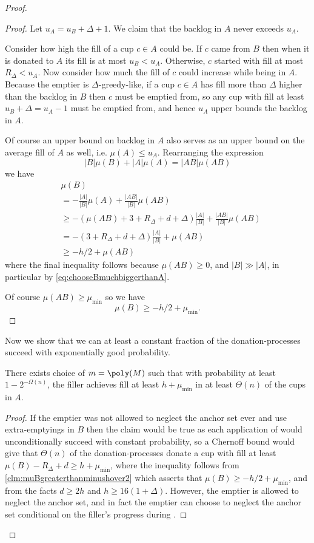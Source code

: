 \begin{proof}
\begin{proof}
  Let $u_A = u_B + \Delta + 1$. We claim that the backlog in $A$
  never exceeds $u_A$.

  Consider how high the fill of a cup $c \in A$ could be.
  If $c$ came from $B$ then when it is donated
  to $A$ its fill is at most $u_B < u_A$. Otherwise, $c$
  started with fill at most $R_\Delta < u_A$. Now consider how
  much the fill of $c$ could increase while being in $A$. Because
  the emptier is $\Delta$-greedy-like, if a cup $c\in A$ has fill
  more than $\Delta$ higher than the backlog in $B$ then $c$ must
  be emptied from, so any cup with fill at least $u_B + \Delta =
  u_A - 1$ must be emptied from, and hence $u_A$ upper bounds the
  backlog in $A$. 

  Of course an upper bound on backlog in $A$ also serves as
  an upper bound on the average fill of $A$ as well, i.e.
  $\mu(A) \le u_A$. 
  Rearranging the expression 
  $$|B|\mu(B) + |A|\mu(A) = |AB|\mu(AB)$$
  we have
  \begin{align*}
    &\mu(B) \\
           &= -\frac{|A|}{|B|} \mu(A) + \frac{|A B|}{|B|}\mu(A B) \\
           &\ge -(\mu(AB) + 3+R_\Delta+d+\Delta) \frac{|A|}{|B|} + \frac{|AB|}{|B|}\mu(AB)\\
           &= -(3+R_\Delta+d + \Delta) \frac{|A|}{|B|} + \mu(AB)\\
           &\ge -h/2 + \mu(AB)
  \end{align*}
  where the final inequality follows because $\mu(AB) \ge 0$, and
  $|B|\gg |A|$, in particular by \eqref{eq:chooseBmuchbiggerthanA}.

  Of course $\mu(AB) \ge \mu_{\min}$ so we have
  $$\mu(B) \ge -h/2 + \mu_{\min}.$$

\end{proof}

Now we show that we can at least a constant fraction of the
donation-processes succeed with exponentially good probability.
\begin{clm}
  There exists choice of $m = \poly(M)$ such that with probability at least
  $1-2^{-\Omega(n)}$, the filler achieves fill at least
  $h+\mu_{\min}$ in at
  least $\Theta(n)$ of the cups in $A$. 
\end{clm}
\begin{proof}
  If the emptier was not allowed to neglect the anchor set ever
  and use extra-emptyings in $B$ then the claim would be true as
  each application of \randalg would unconditionally succeed with
  constant probability, so a Chernoff bound would give that
  $\Theta(n)$ of the donation-processes donate a cup with fill at
  least $\mu(B) - R_\Delta + d \ge h + \mu_{\min}$, where the inequality
  follows from \cref{clm:muBgreaterthanminushover2} which asserts
  that $\mu(B) \ge -h/2 + \mu_{\min}$, and from the facts $d\ge 2h$
  and $h \ge 16(1+\Delta)$.
  However, the emptier is allowed to neglect the anchor set, and
  in fact the emptier can choose to neglect the anchor set
  conditional on the filler's progress during \randalg. 


\end{proof}
\end{proof}
